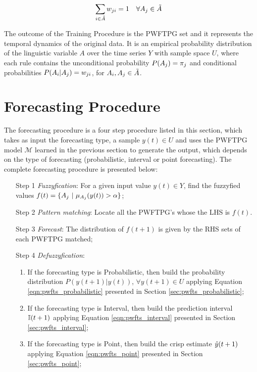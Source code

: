 \begin{enumerate}
\begin{equation}
    \sum_{i \in \tilde{A}} w_{ji} = 1 \quad \forall A_j \in \tilde{A}
    \label{eqn:aposteriori_condition}
\end{equation}


\end{enumerate}

The outcome of the Training Procedure is the PWFTPG set and it represents the temporal dynamics of the original data. It is an empirical probability distribution of the linguistic variable $A$ over the time series $Y$ with sample space $U$, where each rule contains the unconditional probability $P(A_j) = \pi_j$ and conditional probabilities $P(A_i | A_j) = w_{ji}$, for $A_i,A_j \in \tilde{A}$.

\section{Forecasting Procedure}
\label{sec:pwfts_forecasting}

The forecasting procedure is a four step procedure listed in this section, which takes as input the forecasting type, a sample $y(t) \in U$ and uses the PWFTPG model $\mathcal{M}$ learned in the previous section to generate the output, which depends on the type of forecasting  (probabilistic, interval or point forecasting).  The complete forecasting procedure is presented below:

\begin{enumerate}
\item[Step 1] \textit{Fuzzyfication}: For a given input value $y(t) \in Y$, find the fuzzyfied values $f(t) = \{\ufset \ |\ \mu_{\ufset}(y(t)) > \alpha\}$;
\item[Step 2] \textit{Pattern matching}:  Locate all the PWFTPG's whose the LHS is $f(t)$.
\item[Step 3] \textit{Forecast}: The distribution of $f(t+1)$ is given by the RHS sets of each PWFTPG matched;
\item[Step 4] \textit{Defuzzyfication}: 
\begin{enumerate}
    \item If the forecasting type is Probabilistic, then build the probability distribution $P(y(t+1) | y(t))$, $\forall y(t+1) \in U$ applying Equation \ref{eqn:pwfts_probabilistic} presented in Section \ref{sec:pwfts_probabilistic};
    \item If the forecasting type is Interval, then build the prediction interval $\mathbb{I}(t+1)$ applying Equation \ref{eqn:pwfts_interval} presented in Section \ref{sec:pwfts_interval};
    \item If the forecasting type is Point, then build the crisp estimate $\hat{y}(t+1)$ applying Equation \ref{eqn:pwfts_point} presented in Section \ref{sec:pwfts_point};
\end{enumerate}

\end{enumerate}


